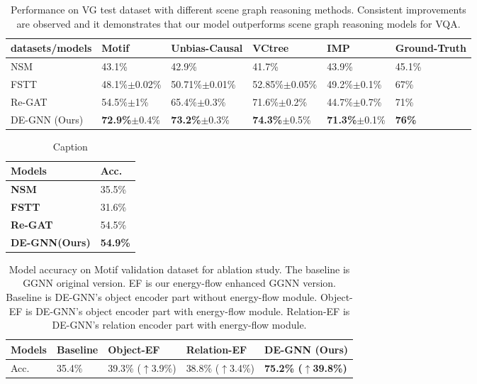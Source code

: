 \begin{table*}
\centering
    \begin{tabular}{llllll}
    \hline
    \textbf{datasets/models}&\textbf{Motif} & \textbf{Unbias-Causal}&\textbf{VCtree}&\textbf{IMP}&\textbf{Ground-Truth}\\
    \hline
     NSM \cite{DBLP:conf/nips/HudsonM19} &43.1\% &42.9\%& 41.7\% & 43.9\% & 45.1\%\\
     FSTT \cite{inproceedings} & 48.1\%$\pm$0.02\% & 50.71\%$\pm$0.01\% & 52.85\%$\pm$0.05\% & 49.2\%$\pm$0.1\% & 67\%\\
     Re-GAT \cite{DBLP:conf/iccv/LiGCL19} &54.5\%$\pm$1\% & 65.4\%$\pm$0.3\% & 71.6\%$\pm$0.2\% &44.7\%$\pm$0.7\% &71\%\\
     DE-GNN (Ours) & \textbf{72.9\%}$\pm$0.4\%& \textbf{73.2\%}$\pm$0.3\% & \textbf{74.3\%}$\pm$0.5\% & \textbf{71.3\%}$\pm$0.1\% &\textbf{76\%}\\
    \hline
    \end{tabular}
\caption{\label{citation-guide}
Performance on VG test dataset with different scene graph reasoning methods. Consistent improvements are observed and it demonstrates that our model outperforms scene graph reasoning models for VQA. 
}
\end{table*}

\begin{table*}
    \centering
    \begin{tabular}{ll}
      \hline
      \textbf{Models}&\textbf{Acc.}\\
      \hline
      \textbf{NSM} & 35.5\% \\ 
      \textbf{FSTT}& 31.6\% \\
      \textbf{Re-GAT}& 54.5\% \\
      \textbf{DE-GNN(Ours)} & \textbf{54.9\%}\\
      \hline
    \end{tabular}
    \caption{Caption}
    \label{tab:my_label}
\end{table*}

\begin{table*}
\centering
    \begin{tabular}{lllll}
    \hline
    \textbf{Models}&\textbf{Baseline} & \textbf{Object-EF}&\textbf{Relation-EF}&\textbf{DE-GNN (Ours)}\\
    \hline
     Acc. & 35.4\% & 39.3\% ($\uparrow$3.9\%) & 38.8\% ($\uparrow$3.4\%) & \textbf{75.2\% ($\uparrow$39.8\%)}  \\
    \hline
    \end{tabular}
\caption{\label{ablation-accuracy}
 Model accuracy on Motif validation dataset for ablation study. The baseline is GGNN original version. EF is our energy-flow enhanced GGNN version. Baseline is DE-GNN's object encoder part without energy-flow module. Object-EF is DE-GNN's object encoder part with energy-flow module. Relation-EF is DE-GNN's relation encoder part with energy-flow module.
}
\end{table*}